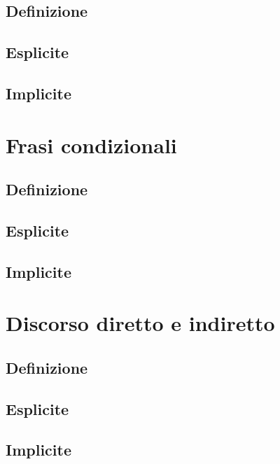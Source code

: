 \documentclass[
  a4paper,
  twoside,
  11pt,
  chapterprefix=false,
  bibliography=totocnumbered,
  listof=flat]{scrbook}
\begin{document}
\hypertarget{definizione-3}{%
\section{Definizione}\label{definizione-3}}

\hypertarget{esplicite-5}{%
\section{Esplicite}\label{esplicite-5}}

\hypertarget{implicite-5}{%
\section{Implicite}\label{implicite-5}}

\hypertarget{frasi-condizionali}{%
\chapter{Frasi condizionali}\label{frasi-condizionali}}

\hypertarget{definizione-4}{%
\section{Definizione}\label{definizione-4}}

\hypertarget{esplicite-6}{%
\section{Esplicite}\label{esplicite-6}}

\hypertarget{implicite-6}{%
\section{Implicite}\label{implicite-6}}

\hypertarget{discorso-diretto-e-indiretto}{%
\chapter{Discorso diretto e indiretto}\label{discorso-diretto-e-indiretto}}

\hypertarget{definizione-5}{%
\section{Definizione}\label{definizione-5}}

\hypertarget{esplicite-7}{%
\section{Esplicite}\label{esplicite-7}}

\hypertarget{implicite-7}{%
\section{Implicite}\label{implicite-7}}

  
\end{document}
